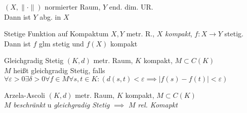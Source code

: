 \begin{lemma}
  $(X, \|\cdot\|)$ normierter Raum, $Y$ end. dim. UR.\\
  Dann ist $Y$ abg. in $X$
\end{lemma}

\begin{satz}{Stetige Funktion auf Kompaktum}
  $X,Y$ metr. R., $X$ \textit{kompakt}, $f:X\to Y$ stetig.\\
  Dann ist $f$ glm stetig und $f(X)$ kompakt
\end{satz}

\begin{definition}{Gleichgradig Stetig}
  $(K,d)$ metr. Raum, $K$ kompakt, $M \subset C(K)$\\
  $M$ heißt gleichgradig Stetig, falls
  $\forall \varepsilon >0 \exists \delta >0 \forall f \in M \forall s,t \in K:
  (d(s,t) < \varepsilon \implies |f(s) - f(t)| < \varepsilon)$
\end{definition}

\begin{satz}{Arzela-Ascoli}
  $(K,d)$ metr. Raum, $K$ kompakt, $M \subset C(K)$\\
  $M$ \textit{beschränkt} u \textit{gleichgradig Stetig} $\implies$ $M$
  \textit{rel. Komapkt}
\end{satz}
